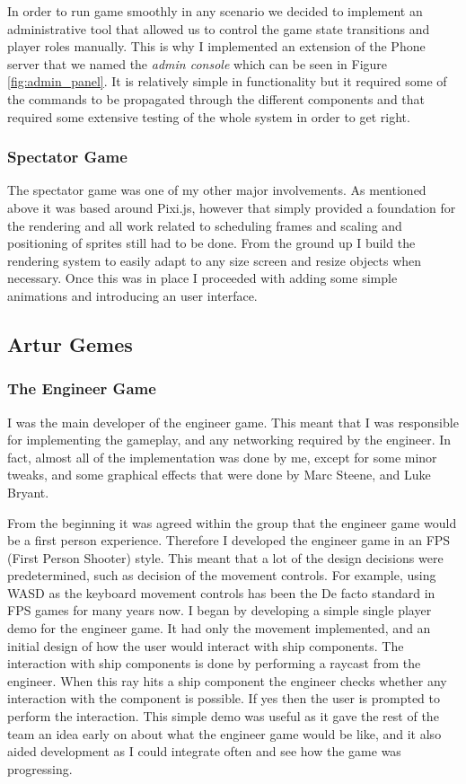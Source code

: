 \documentclass[a4paper,11pt]{article}
\begin{document}
In order to run game smoothly in any scenario we decided to implement an administrative tool that allowed us to control the game state transitions and player roles manually. This is why I implemented an extension of the Phone server that we named the \emph{admin console} which can be seen in Figure \ref{fig:admin_panel}. It is relatively simple in functionality but it required some of the commands to be propagated through the different components and that required some extensive testing of the whole system in order to get right.

\subsubsection{Spectator Game}

The spectator game was one of my other major involvements. As mentioned above it was based around Pixi.js, however that simply provided a foundation for the rendering and all work related to scheduling frames and scaling and positioning of sprites still had to be done. From the ground up I build the rendering system to easily adapt to any size screen and resize objects when necessary. Once this was in place I proceeded with adding some simple animations and introducing an user interface.

\clearpage

\subsection{Artur Gemes}

\subsubsection{The Engineer Game}

I was the main developer of the engineer game. This meant that I was responsible for implementing the gameplay, and any networking required by the engineer. In fact, almost all of the implementation was done by me, except for some minor tweaks, and some graphical effects that were done by Marc Steene, and Luke Bryant.

From the beginning it was agreed within the group that the engineer game would be a first person experience. Therefore I developed the engineer game in an FPS (First Person Shooter) style. This meant that a lot of the design decisions were predetermined, such as decision of the movement controls. For example, using WASD as the keyboard movement controls has been the De facto standard in FPS games for many years now. I began by developing a simple single player demo for the engineer game. It had only the movement implemented, and an initial design of how the user would interact with ship components. The interaction with ship components is done by performing a raycast from the engineer. When this ray hits a ship component the engineer checks whether any interaction with the component is possible. If yes then the user is prompted to perform the interaction. This simple demo was useful as it gave the rest of the team an idea early on about what the engineer game would be like, and it also aided development as I could integrate often and see how the game was progressing.
\end{document}
